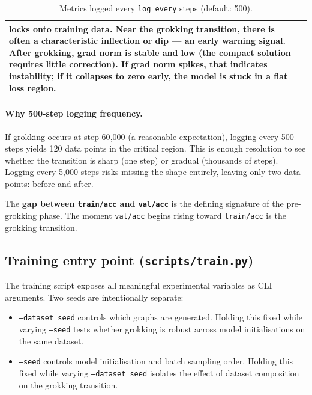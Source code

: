 \documentclass[11pt, a4paper]{article}
\begin{document}
\begin{table}[H]
\begin{tabular}{@{}lp{9cm}@{}}
                            locks onto training data. Near the grokking transition, there is
                            often a characteristic inflection or dip --- an early warning
                            signal. After grokking, grad norm is stable and low (the compact
                            solution requires little correction). If grad norm spikes, that
                            indicates instability; if it collapses to zero early, the model
                            is stuck in a flat loss region. \\
\bottomrule
\end{tabular}
\caption{Metrics logged every \texttt{log\_every} steps (default: 500).}
\end{table}

\paragraph{Why 500-step logging frequency.}
If grokking occurs at step 60{,}000 (a reasonable expectation), logging every
500 steps yields 120 data points in the critical region. This is enough
resolution to see whether the transition is sharp (one step) or gradual
(thousands of steps). Logging every 5{,}000 steps risks missing the shape
entirely, leaving only two data points: before and after.

The \textbf{gap between \texttt{train/acc} and \texttt{val/acc}} is the
defining signature of the pre-grokking phase. The moment \texttt{val/acc}
begins rising toward \texttt{train/acc} is the grokking transition.

\subsection{Training entry point (\texttt{scripts/train.py})}

The training script exposes all meaningful experimental variables as CLI
arguments. Two seeds are intentionally separate:

\begin{itemize}[noitemsep]
  \item \texttt{--dataset\_seed} controls which graphs are generated. Holding
        this fixed while varying \texttt{--seed} tests whether grokking is
        robust across model initialisations on the same dataset.
  \item \texttt{--seed} controls model initialisation and batch sampling order.
        Holding this fixed while varying \texttt{--dataset\_seed} isolates the
        effect of dataset composition on the grokking transition.
\end{itemize}
\end{document}
